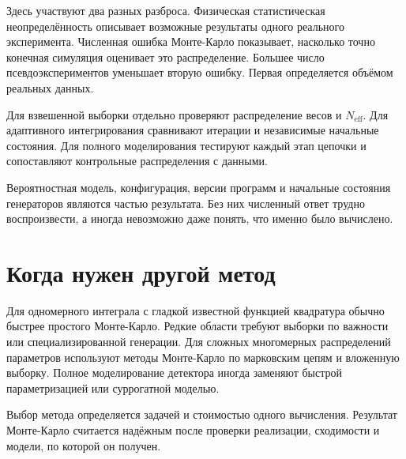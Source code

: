 \documentclass[
  russian,
  11pt,
  a4paper,
  open=any]{scrbook}
\begin{document}
\begin{booknote}

Здесь участвуют два разных разброса. Физическая статистическая
неопределённость описывает возможные результаты одного реального
эксперимента. Численная ошибка Монте-Карло показывает, насколько точно
конечная симуляция оценивает это распределение. Большее число
псевдоэкспериментов уменьшает вторую ошибку. Первая определяется объёмом
реальных данных.

\end{booknote}

Для взвешенной выборки отдельно проверяют распределение весов и
\(N_{\mathrm{eff}}\). Для адаптивного интегрирования сравнивают итерации
и независимые начальные состояния. Для полного моделирования тестируют
каждый этап цепочки и сопоставляют контрольные распределения с данными.

Вероятностная модель, конфигурация, версии программ и начальные
состояния генераторов являются частью результата. Без них численный
ответ трудно воспроизвести, а иногда невозможно даже понять, что именно
было вычислено.

\section{Когда нужен другой
метод}\label{ux43aux43eux433ux434ux430-ux43dux443ux436ux435ux43d-ux434ux440ux443ux433ux43eux439-ux43cux435ux442ux43eux434}

Для одномерного интеграла с гладкой известной функцией квадратура обычно
быстрее простого Монте-Карло. Редкие области требуют выборки по важности
или специализированной генерации. Для сложных многомерных распределений
параметров используют методы Монте-Карло по марковским цепям и вложенную
выборку. Полное моделирование детектора иногда заменяют быстрой
параметризацией или суррогатной моделью.

Выбор метода определяется задачей и стоимостью одного вычисления.
Результат Монте-Карло считается надёжным после проверки реализации,
сходимости и модели, по которой он получен.
\end{document}
